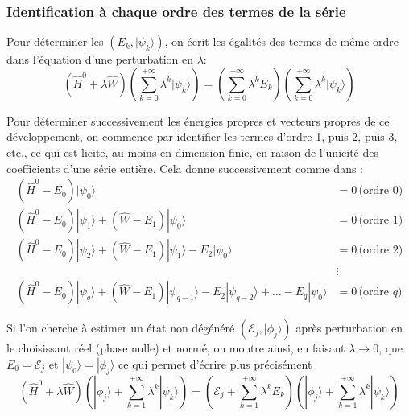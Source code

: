 \documentclass[svgnames,dvipsnames,a4paper,10pt,french]{report}
\begin{document}
\subsubsection{Identification à chaque ordre des termes de la série}
Pour déterminer les $(E_k,|\psi_k\rangle)$, on écrit les égalités des termes de même ordre dans l'équation d'une perturbation en $\lambda$:
\begin{equation}
    (\hat{H}^0 + \lambda \hat{W}) \left(  \sum_{k=0}^{+\infty} \lambda^k |\psi_k\rangle \right) = \left(  \sum_{k=0}^{+\infty} \lambda^k E_k \right) \left( \sum_{k=0}^{+\infty} \lambda^k |\psi_k\rangle \right)
\end{equation}




Pour déterminer successivement les énergies propres et vecteurs propres de ce développement, on commence par identifier les termes d'ordre 1, puis 2, puis 3, etc., ce qui est licite, au moins en dimension finie, en raison de l'unicité des coefficients d'une série entière. Cela donne successivement comme dans \cite{cohen-tannoudji_mecanique_2021-1}:
\begin{align}
    (\hat{H}^0-E_0) |\psi_0\rangle &= 0 \, \text{(ordre 0)}\label{ordre0} \\
    (\hat{H}^0-E_0) |\psi_1\rangle + (\hat{W}-E_1) |\psi_0\rangle &=0 \, \text{(ordre 1)} \label{ordre1} \\
    (\hat{H}^0-E_0) |\psi_2\rangle + (\hat{W}-E_1) |\psi_1\rangle - E_2 |\psi_0\rangle &= 0 \, \text{(ordre 2)}  \label{ordre2}\\
    &\vdots \\
    (\hat{H}^0 - E_0) |\psi_q\rangle + (\hat{W}-E_1)|\psi_{q-1}\rangle -E_2 |\psi_{q-2}\rangle + \dots - E_q |\psi_0\rangle &= 0 \, \text{(ordre $q$)} \label{ordreq}
\end{align}

Si l'on cherche à estimer un état non dégénéré $(\mathcal{E}_j, |\phi_j\rangle)$ après perturbation en le choisissant réel (phase nulle) et normé, on montre ainsi, en faisant $\lambda \rightarrow 0$, que $E_0 = \mathcal{E}_j$ et $|\psi_0 \rangle = |\phi_j\rangle$ ce qui permet d'écrire plus précisément
\begin{equation}
    (\hat{H}^0 + \lambda \hat{W}) \left( |\phi_j\rangle + \sum_{k=1}^{+\infty} \lambda^k |\psi_k\rangle \right) = \left( \mathcal{E}_j + \sum_{k=1}^{+\infty} \lambda^k E_k \right) \left(|\phi_j\rangle + \sum_{k=1}^{+\infty} \lambda^k |\psi_k\rangle \right)
\end{equation}
\end{document}
